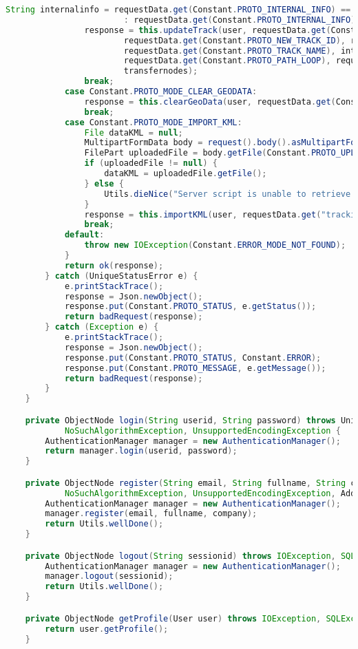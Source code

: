 \begin{lstlisting}[language=Java,basicstyle=\tiny,caption=controllers/Application.java,label={lst:application.java}]
				String internalinfo = requestData.get(Constant.PROTO_INTERNAL_INFO) == null ? ""
						: requestData.get(Constant.PROTO_INTERNAL_INFO);
				response = this.updateTrack(user, requestData.get(Constant.PROTO_TRACK_ID),
						requestData.get(Constant.PROTO_NEW_TRACK_ID), requestData.get(Constant.PROTO_TRACK_TYPE),
						requestData.get(Constant.PROTO_TRACK_NAME), internalinfo,
						requestData.get(Constant.PROTO_PATH_LOOP), requestData.get(Constant.PROTO_PENALTY),
						transfernodes);
				break;
			case Constant.PROTO_MODE_CLEAR_GEODATA:
				response = this.clearGeoData(user, requestData.get(Constant.PROTO_TRACK_ID));
				break;
			case Constant.PROTO_MODE_IMPORT_KML:
				File dataKML = null;
				MultipartFormData body = request().body().asMultipartFormData();
				FilePart uploadedFile = body.getFile(Constant.PROTO_UPLOADED_FILE);
				if (uploadedFile != null) {
					dataKML = uploadedFile.getFile();
				} else {
					Utils.dieNice("Server script is unable to retrieve the file");
				}
				response = this.importKML(user, requestData.get("trackid"), dataKML);
				break;
			default:
				throw new IOException(Constant.ERROR_MODE_NOT_FOUND);
			}
			return ok(response);
		} catch (UniqueStatusError e) {
			e.printStackTrace();
			response = Json.newObject();
			response.put(Constant.PROTO_STATUS, e.getStatus());
			return badRequest(response);
		} catch (Exception e) {
			e.printStackTrace();
			response = Json.newObject();
			response.put(Constant.PROTO_STATUS, Constant.ERROR);
			response.put(Constant.PROTO_MESSAGE, e.getMessage());
			return badRequest(response);
		}
	}

	private ObjectNode login(String userid, String password) throws UniqueStatusError, IOException, SQLException,
			NoSuchAlgorithmException, UnsupportedEncodingException {
		AuthenticationManager manager = new AuthenticationManager();
		return manager.login(userid, password);
	}

	private ObjectNode register(String email, String fullname, String company) throws IOException, SQLException,
			NoSuchAlgorithmException, UnsupportedEncodingException, AddressException, MessagingException {
		AuthenticationManager manager = new AuthenticationManager();
		manager.register(email, fullname, company);
		return Utils.wellDone();
	}

	private ObjectNode logout(String sessionid) throws IOException, SQLException {
		AuthenticationManager manager = new AuthenticationManager();
		manager.logout(sessionid);
		return Utils.wellDone();
	}

	private ObjectNode getProfile(User user) throws IOException, SQLException {
		return user.getProfile();
	}


\end{lstlisting}
